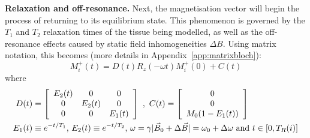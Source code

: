 \textbf{Relaxation and off-resonance.} 
Next, the magnetisation vector will begin the process of returning to its equilibrium state.
This phenomenon is governed by the $T_1$ and $T_2$ relaxation times of the tissue being modelled, as well as the off-resonance effects caused by static field inhomogeneities $\Delta B$.
Using matrix notation, this becomes (more details in Appendix~\ref{app:matrixbloch}):
\begin{equation}\label{eq:multiblockdyn}
    M^{+}_i (t)  = D(t) R_z(-\omega t) M^{+}_i (0) + C(t)
\end{equation}
where
\begin{equation}\label{eq:dmatrix}
    \begin{split}
        D ( t ) &= \left[
        \begin{array}{c c c}
              E_2(t) &     0      &     0 \\
               0     &   E_2(t)   &     0 \\
               0     &     0      &   E_1(t)
        \end{array}
        \right] \, \, \text{, } \, 
        C ( t ) = \left[
        \begin{array}{c}
            0 \\
            0 \\
        M_0(1 - E_1(t))
        \end{array}
        \right] \\
        E_1(t) &\equiv e^{-t/T_1} \text{, } E_2(t) \equiv e^{-t/T_2} \text{, } \omega = \gamma \lvert \vec{B}_0 + \Delta \vec{B} \rvert = \omega_0 + \Delta \omega \text{ and } t \in [0, T_R(i)]
    \end{split}
\end{equation}

